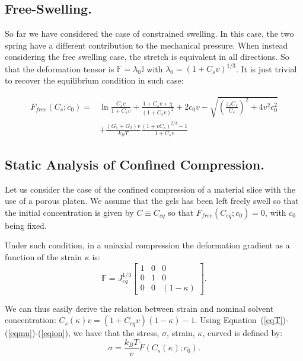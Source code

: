 \documentclass[12pt]{extarticle}
\newcommand{\F}{\ensuremath{\mathbb{F}}}
\begin{document}
\subsection{Free-Swelling.}
So far we have considered the case of constrained swelling. In this case, the two spring have a different contribution to the mechanical pressure. When instead considering the free swelling case, the stretch is equivalent in all directions. So that the deformation tensor is $\F=\lambda_0 \mathbb{I}$ with $\lambda_0=(1+C_sv)^{1/3}$. It is just trivial to recover the equilibrium condition in such case:

\begin{equation}
\begin{aligned}
F_{free}(C_s; c_0)=&\ln \frac{C_sv}{1+C_sv} +\frac{1+C_sv+\chi}{(1+C_sv)^2}+2c_0v-\sqrt{\left(\frac{z_fC_f}{C_s}\right)^2+4v^2c^2_0} \\[1.5mm]
&+\frac{(G_1+G_2)v}{k_BT} \frac{(1+vC_s)^{2/3}-1}{1+C_sv}
\end{aligned}
\end{equation}

\subsection{Static Analysis of Confined Compression.}
Let us consider the case of the confined compression of a material slice with the use of a porous platen. We assume that the gels has been left freely swell so that the initial concentration is given by $C\equiv C_{eq}$ so that $F_{free}(C_{eq};c_0)=0$, with $c_0$ being fixed.

Under such condition, in a uniaxial compression the deformation gradient as a function of the strain $\kappa$ is:
\begin{equation}
\F=J^{1/3}_{eq} \begin{bmatrix}
1 &0&0\\
0&1&0\\
0&0& (1-\kappa)
\end{bmatrix}. 
\end{equation}

We can thus easily derive the relation between strain and nominal solvent concentration:
$C_s(\kappa)v= (1+C_{eq}v)(1-\kappa)-1$. Using Equation~(\ref{eqT})-(\ref{eqmu})-(\ref{eqion}), we have that the stress, $\sigma$, strain, $\kappa$, curved is defined by:
\begin{equation}
\sigma=\frac{k_BT}{v}\tilde{F}(C_s(\kappa);c_0).
\end{equation}
\end{document}
